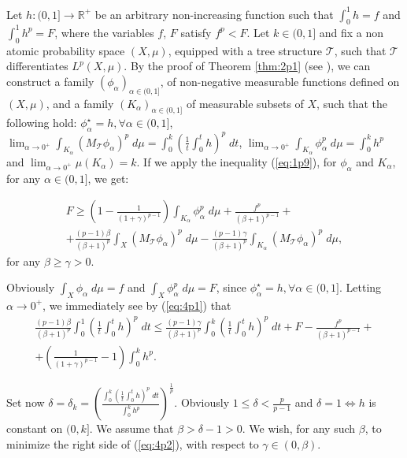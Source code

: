 \documentclass{article}
\numberwithin{equation}{section}
\theoremstyle{definition}
\theoremstyle{remark}
\newcommand{\mc}[1]{\mathcal{#1}}
\begin{document}
Let $h:(0,1]\longrightarrow \mathbb{R}^{+}$ be an arbitrary non-increasing function such that $\int_0^1 h=f$ and $\int_0^1 h^p=F$, where the variables $f$, $F$ satisfy $f^p<F$. Let $k\in (0,1]$ and fix a non atomic probability space $(X,\mu)$, equipped with a tree structure $\mc T$, such that $\mc T$ differentiates $L^p(X,\mu)$. By the proof of Theorem \ref{thm:2p1} (see \cite{NM}), we can construct a family $(\phi_{\alpha})_{\alpha\in (0,1]}$, of non-negative measurable functions defined on $(X,\mu)$, and a family $(K_{\alpha})_{\alpha\in (0,1]}$ of measurable subsets of $X$, such that the following hold: $\phi_{\alpha}^{\star}=h, \forall \alpha\in (0,1]$, $\lim_{\alpha\rightarrow 0^{+}}\int_{K_{\alpha}}\left(M_{\mc T}\phi_{\alpha} \right)^p\; d\mu=\int_0^k \left( \frac{1}{t}\int_0^t h \right)^p \;dt$, $\lim_{\alpha\rightarrow 0^{+}}\int_{K_{\alpha}} \phi_{\alpha}^p\;d\mu = \int_0^k h^p$ and $\lim_{\alpha\rightarrow 0^{+}} \mu(K_{\alpha})=k$.
If we apply the inequality (\ref{eq:1p9}), for $\phi_{\alpha}$ and $K_{\alpha}$, for any $\alpha\in (0,1]$, we get:


\begin{multline} \label{eq:4p1}
F \geq \left( 1-\frac{1}{(1+\gamma)^{p-1}} \right) \int_{K_{\alpha}} \phi_{\alpha}^p\;d\mu + \frac{f^p}{(\beta+1)^{p-1}}+\\
+\frac{(p-1)\beta}{(\beta+1)^p} \int_X \left( M_{\mc T}\phi_{\alpha} \right)^p\;d\mu - \frac{(p-1)\gamma}{(\beta+1)^p} \int_{K_{\alpha}} \left( M_{\mc T}\phi_{\alpha} \right)^p\;d\mu,
\end{multline}
for any $\beta\geq \gamma>0$.

Obviously $\int_X \phi_{\alpha}\; d\mu=f$ and $\int_X \phi_{\alpha}^p \; d\mu=F$, since $\phi_{\alpha}^{\star}=h, \forall \alpha\in (0,1]$.
Letting $\alpha\rightarrow 0^{+}$, we immediately see by (\ref{eq:4p1}) that
\begin{multline} \label{eq:4p2}
\frac{(p-1)\beta}{(\beta+1)^p} \int_0^1\left(\frac{1}{t} \int_0^t h \right)^p\; dt \leq \frac{(p-1)\gamma}{(\beta+1)^p}\int_0^k\left(\frac{1}{t} \int_0^t h \right)^p\; dt +F - \frac{f^p}{(\beta+1)^{p-1}}+\\
+ \left( \frac{1}{(1+\gamma)^{p-1}}-1 \right)\int_0^k h^p.
\end{multline}

Set now $\delta=\delta_k=\left( \frac{\int_0^k\left(\frac{1}{t}\int_0^t h\right)^p\; dt}{\int_0^k h^p} \right)^{\frac{1}{p}}$. Obviously $1\leq \delta< \frac{p}{p-1}$ and $\delta=1\Leftrightarrow h$ is constant on $(0,k]$. We assume that $\beta>\delta-1>0$.
We wish, for any such $\beta$, to minimize the right side of (\ref{eq:4p2}), with respect to $\gamma\in(0,\beta)$. 
\end{document}
